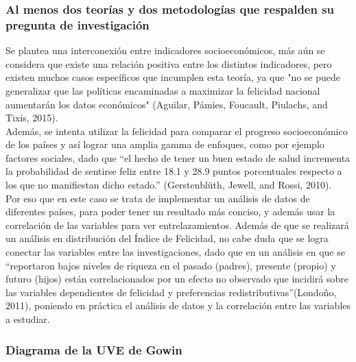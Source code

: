 \subsubsection{Al menos dos teorías y dos metodologías que respalden su pregunta de investigación} 

Se plantea una interconexión entre indicadores socioeconómicos, más aún se considera que existe una relación positiva entre los distintos indicadores, pero existen muchos casos específicos que incumplen esta teoría, ya que "no se puede generalizar que las políticas encaminadas a maximizar la felicidad nacional aumentarán los datos económicos" (Aguilar, Pámies, Foucault, Piulachs, and Tixis, 2015). \\

Además, se intenta utilizar la felicidad para comparar el progreso socioeconómico de los países y así lograr una amplia gamma de enfoques, como por ejemplo factores sociales, dado que ``el hecho de tener un buen estado de salud incrementa la probabilidad de sentirse feliz entre 18.1 y 28.9 puntos porcentuales respecto a los que no manifiestan dicho estado.'' (Gerstenblüth, Jewell, and Rossi, 2010). \\

Por eso que en este caso se trata de implementar un análisis de datos de diferentes países, para poder tener un resultado más conciso, y además usar la correlación de las variables para ver entrelazamientos. Además de que se realizará un análisis en distribución del Índice de Felicidad, no cabe duda que se logra conectar las variables entre las investigaciones, dado que en un análisis en que se ``reportaron bajos niveles de riqueza en el pasado (padres), presente (propio) y futuro (hijos) están correlacionados por un efecto no observado que incidirá sobre las variables dependientes de felicidad y preferencias redistributivas''(Londoño, 2011), poniendo en práctica el análisis de datos y la correlación entre las variables a estudiar. \\


\subsubsection{Diagrama de la UVE de Gowin}

